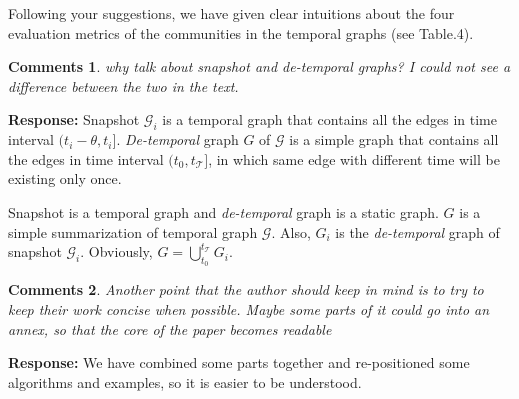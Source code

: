 \documentclass{article}
\newtheorem{Comments}{\textbf{Comments}}
\begin{document}
Following your suggestions, we have given clear intuitions about the four evaluation metrics of the communities in the temporal graphs (see Table.4).


\begin{Comments}	
	why talk about snapshot and de-temporal graphs? I could not see a difference between the two in the text.
\end{Comments}
\noindent \textbf{Response: } %
Snapshot ${\mathcal G}_i$ is a temporal graph that contains all the edges in time interval $(t_i-\theta, t_i]$. \emph{De-temporal} graph $G$ of $\mathcal{G}$ is a simple graph that contains all the edges in time interval $(t_0, t_{\mathcal{T}}]$, in which same edge with different time will be existing only once. 

Snapshot is a temporal graph and \emph{de-temporal} graph is a static graph.
$G$ is a simple summarization of temporal graph $\mathcal G$. 
Also, $G_i$  is the \emph{de-temporal} graph of snapshot $\mathcal G_i$.
Obviously, $G = \bigcup_{t_0}^{t_{\mathcal{T}} }G_i$.

\begin{Comments}
Another point that the author should keep in mind is to try to keep their work concise when possible. Maybe some parts of it could go into an annex, so that the core of the paper becomes readable
\end{Comments}
\noindent \textbf{Response: }We have combined some parts together and re-positioned some algorithms and examples, so it is easier to be understood. 
\end{document}

